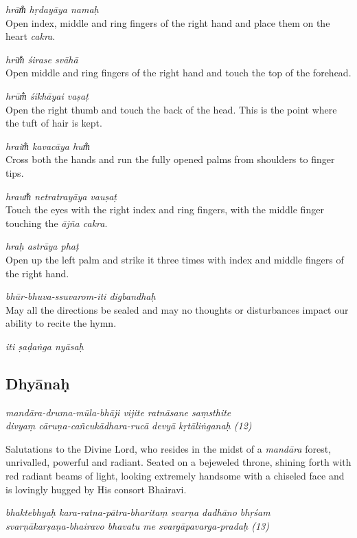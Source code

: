 \documentclass[12pt,oneside,a4paper]{article}
\newenvironment{shloka}[1]
  {\bigskip\center#1\varwidth{\linewidth}}
  {\endvarwidth\endcenter\bigskip}
\newcommand{\tl}[1]{\emph{#1}}
\begin{document}
\tl{hrām̐ hṛdayāya namaḥ}\\
Open index, middle and ring fingers of the right hand and place them on
the heart \tl{cakra}.

\tl{hrīm̐ śirase svāhā}\\
Open middle and ring fingers of the right hand and touch the top of
the forehead.

\tl{hrūm̐ śikhāyai vaṣaṭ}\\
Open the right thumb and touch the back of the head. This is the point where
the tuft of hair is kept.

\tl{hraim̐ kavacāya hum̐}\\
Cross both the hands and run the fully opened palms from shoulders to
finger tips.

\tl{hraum̐ netratrayāya vauṣaṭ}\\
Touch the eyes with the right index and ring fingers, with the middle finger
touching the \tl{ājña cakra}.

\tl{hraḥ astrāya phaṭ}\\
Open up the left palm and strike it three times with index and middle fingers
of the right hand.

\tl{bhūr-bhuva-ssuvarom-iti digbandhaḥ}\\
May all the directions be sealed and may no thoughts or disturbances impact our
ability to recite the hymn.

\begin{shloka}\itshape
  iti ṣaḍaṅga nyāsaḥ
\end{shloka}

\subsection{Dhyānaḥ}

\begin{shloka}\itshape
  mandāra-druma-mūla-bhāji vijite ratnāsane saṃsthite\\
  divyaṃ cāruṇa-cañcukādhara-rucā devyā kṛtāliṅganaḥ (12)
\end{shloka}

Salutations to the Divine Lord, who resides in the midst of a \tl{mandāra}
forest, unrivalled, powerful and radiant. Seated on a bejeweled throne, shining
forth with red radiant beams of light, looking extremely handsome with
a chiseled face and is lovingly hugged by His consort Bhairavi.

\begin{shloka}\itshape
  bhaktebhyaḥ kara-ratna-pātra-bharitaṃ svarṇa dadhāno bhṛśam\\
  svarṇākarṣaṇa-bhairavo bhavatu me svargāpavarga-pradaḥ (13)
\end{shloka}
\end{document}

